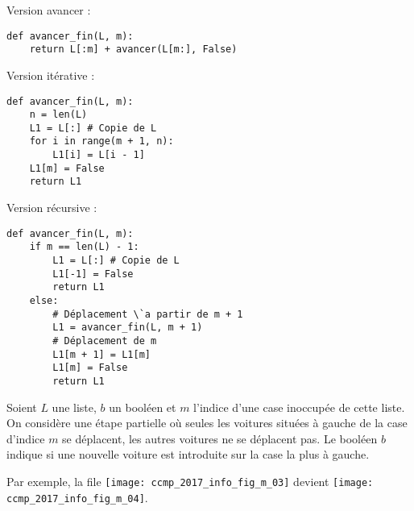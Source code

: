 \ifprof
\begin{corrige}
Version avancer :
\begin{lstlisting}
def avancer_fin(L, m):
    return L[:m] + avancer(L[m:], False)
\end{lstlisting}


Version itérative :
\begin{lstlisting}
def avancer_fin(L, m):
    n = len(L)
    L1 = L[:] # Copie de L
    for i in range(m + 1, n):
        L1[i] = L[i - 1]
    L1[m] = False
    return L1
\end{lstlisting}


Version récursive :
\begin{lstlisting}
def avancer_fin(L, m):
    if m == len(L) - 1:
        L1 = L[:] # Copie de L
        L1[-1] = False
        return L1
    else:
        # Déplacement \`a partir de m + 1
        L1 = avancer_fin(L, m + 1) 
        # Déplacement de m
        L1[m + 1] = L1[m]          
        L1[m] = False
        return L1
\end{lstlisting}
\end{corrige}
\else
\fi

\ifprof
\else
Soient $L$ une liste, $b$ un booléen et $m$ l'indice d'une case inoccupée de cette liste.
On considère une étape partielle où seules les voitures situées à gauche de la case d'indice $m$ se
déplacent, les autres voitures ne se déplacent pas. Le booléen $b$ indique si une nouvelle voiture est
introduite sur la case la plus à gauche.


Par exemple, la file \texttt{[image: ccmp\_2017\_info\_fig\_m\_03]}
 devient \texttt{[image: ccmp\_2017\_info\_fig\_m\_04]}.


